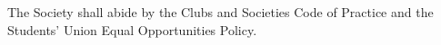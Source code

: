 \begin{clause}
The Society shall abide by the Clubs and Societies Code of Practice and the Students' Union Equal Opportunities Policy.
\end{clause}